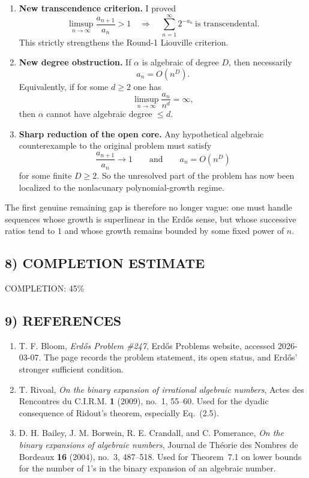 \begin{enumerate}
\item \textbf{New transcendence criterion.}
I proved
\[
\limsup_{n\to\infty}\frac{a_{n+1}}{a_n}>1
\quad\Longrightarrow\quad
\sum_{n=1}^\infty 2^{-a_n}\ \text{is transcendental}.
\]
This strictly strengthens the Round-1 Liouville criterion.

\item \textbf{New degree obstruction.}
If $\alpha$ is algebraic of degree $D$, then necessarily
\[
a_n=O(n^D).
\]
Equivalently, if for some $d\ge 2$ one has
\[
\limsup_{n\to\infty}\frac{a_n}{n^d}=\infty,
\]
then $\alpha$ cannot have algebraic degree $\le d$.

\item \textbf{Sharp reduction of the open core.}
Any hypothetical algebraic counterexample to the original problem must satisfy
\[
\frac{a_{n+1}}{a_n}\to 1
\qquad\text{and}\qquad
 a_n=O(n^D)
\]
for some finite $D\ge 2$.
So the unresolved part of the problem has now been localized to the nonlacunary polynomial-growth regime.
\end{enumerate}

The first genuine remaining gap is therefore no longer vague: one must handle sequences whose growth is superlinear in the Erd\H{o}s sense, but whose successive ratios tend to $1$ and whose growth remains bounded by some fixed power of $n$.

\subsection*{8) COMPLETION ESTIMATE}
COMPLETION: 45\%

\subsection*{9) REFERENCES}
\begin{enumerate}
\item T. F. Bloom, \emph{Erd\H{o}s Problem \#247}, Erd\H{o}s Problems website, accessed 2026-03-07. The page records the problem statement, its open status, and Erd\H{o}s' stronger sufficient condition.

\item T. Rivoal, \emph{On the binary expansion of irrational algebraic numbers}, Actes des Rencontres du C.I.R.M. \textbf{1} (2009), no.~1, 55--60. Used for the dyadic consequence of Ridout's theorem, especially Eq.~(2.5).

\item D. H. Bailey, J. M. Borwein, R. E. Crandall, and C. Pomerance, \emph{On the binary expansions of algebraic numbers}, Journal de Th\'eorie des Nombres de Bordeaux \textbf{16} (2004), no.~3, 487--518. Used for Theorem~7.1 on lower bounds for the number of 1's in the binary expansion of an algebraic number.
\end{enumerate}
